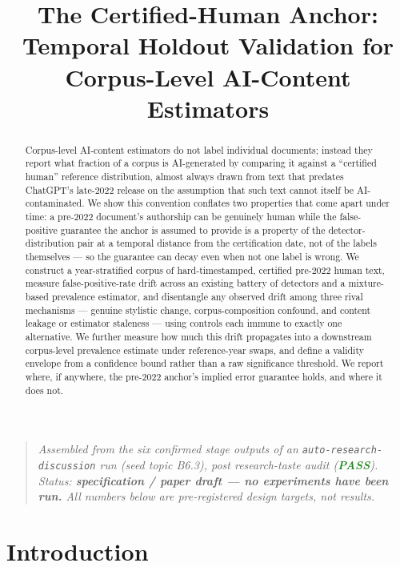 \documentclass[11pt]{article}
\title{\textbf{The Certified-Human Anchor:\\ Temporal Holdout Validation for Corpus-Level AI-Content Estimators}}
\author{}
\date{}
\begin{document}
\maketitle
\vspace{-2em}

\begin{quote}
\small\textit{Assembled from the six confirmed stage outputs of an \texttt{auto-research-discussion} run (seed topic B6.3), post research-taste audit (\textcolor{ForestGreen}{\textbf{PASS}}). Status: \textbf{specification / paper draft --- no experiments have been run.} All numbers below are pre-registered design targets, not results.}
\end{quote}

\begin{abstract}
Corpus-level AI-content estimators do not label individual documents; instead they report what fraction of a corpus is AI-generated by comparing it against a ``certified human'' reference distribution, almost always drawn from text that predates ChatGPT's late-2022 release on the assumption that such text cannot itself be AI-contaminated. We show this convention conflates two properties that come apart under time: a pre-2022 document's authorship can be genuinely human while the false-positive guarantee the anchor is assumed to provide is a property of the detector-distribution pair at a temporal distance from the certification date, not of the labels themselves --- so the guarantee can decay even when not one label is wrong. We construct a year-stratified corpus of hard-timestamped, certified pre-2022 human text, measure false-positive-rate drift across an existing battery of detectors and a mixture-based prevalence estimator, and disentangle any observed drift among three rival mechanisms --- genuine stylistic change, corpus-composition confound, and content leakage or estimator staleness --- using controls each immune to exactly one alternative. We further measure how much this drift propagates into a downstream corpus-level prevalence estimate under reference-year swaps, and define a validity envelope from a confidence bound rather than a raw significance threshold. We report where, if anywhere, the pre-2022 anchor's implied error guarantee holds, and where it does not.
\end{abstract}

\section{Introduction}
\end{document}
